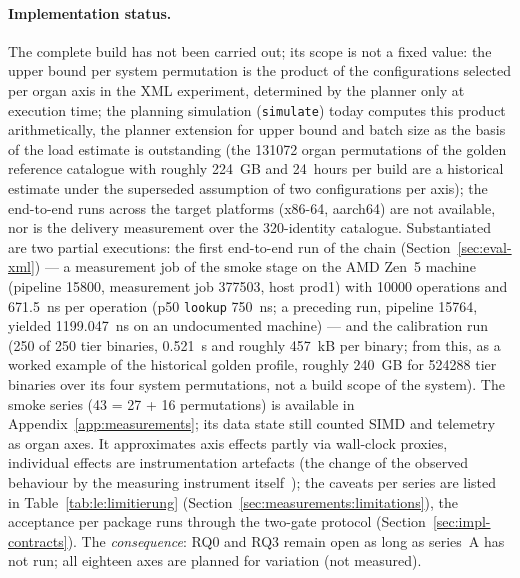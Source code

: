 \begin{nurkurz}
\paragraph{Implementation status.} The complete build has not been carried out; its scope is not a fixed
value: the upper bound per system permutation is the product of the configurations selected per organ axis
in the XML experiment, determined by the planner only at execution time; the planning simulation
(\texttt{simulate}) today computes this product arithmetically, the planner extension for upper bound and
batch size as the basis of the load estimate is outstanding (the 131072 organ permutations of the golden
reference catalogue with roughly 224~GB and 24~hours per build are a historical estimate under the superseded
assumption of two configurations per axis); the end-to-end runs across the target
platforms (x86-64, aarch64) are not available, nor is the delivery measurement over the 320-identity
catalogue. Substantiated are two partial executions: the first end-to-end run of the chain
(Section~\ref{sec:eval-xml}) --- a measurement job of the smoke stage on the AMD Zen~5 machine (pipeline
15800, measurement job 377503, host prod1) with 10000 operations and 671.5~ns per operation (p50
\texttt{lookup} 750~ns; a preceding run, pipeline 15764, yielded 1199.047~ns on an undocumented machine)
--- and the calibration run (250 of 250 tier binaries, 0.521~s and roughly 457~kB per binary; from this, as a worked example of the historical golden profile, roughly 240~GB for 524288 tier binaries
over its four system permutations, not a build scope of the system). The
smoke series (43 = 27 + 16 permutations) is available in Appendix~\ref{app:measurements}; its data state
still counted SIMD and telemetry as organ axes. It approximates axis effects partly via wall-clock proxies,
individual effects are instrumentation artefacts (the change of the observed behaviour by the measuring
instrument itself~\cite{gait1986probe}); the caveats per series are listed in
Table~\ref{tab:le:limitierung} (Section~\ref{sec:measurements:limitations}), the acceptance per package
runs through the two-gate protocol (Section~\ref{sec:impl-contracts}). The \emph{consequence}: RQ0 and RQ3
remain open as long as series~A has not run; all eighteen axes are planned for variation (not measured).
\end{nurkurz}

